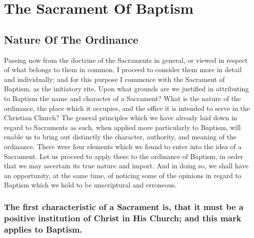 \documentclass[english,]{book}
\begin{document}
\hypertarget{the-sacrament-of-baptism}{%
\chapter{The Sacrament Of Baptism}\label{the-sacrament-of-baptism}}

\hypertarget{nature-of-baptism}{%
\section{Nature Of The Ordinance}\label{nature-of-baptism}}

Passing now from the doctrine of the Sacraments in general, or viewed in respect of what belongs to them in common, I proceed to consider them more in detail and individually; and for this purpose I commence with the Sacrament of Baptism, as the initiatory rite. Upon what grounds are we justified in attributing to Baptism the name and character of a Sacrament? What is the nature of the ordinance, the place which it occupies, and the office it is intended to serve in the Christian Church? The general principles which we have already laid down in regard to Sacraments as such, when applied more particularly to Baptism, will enable us to bring out distinctly the character, authority, and meaning of the ordinance. There were four elements which we found to enter into the idea of a Sacrament. Let us proceed to apply these to the ordinance of Baptism, in order that we may ascertain its true nature and import. And in doing so, we shall have an opportunity, at the same time, of noticing some of the opinions in regard to Baptism which we hold to be unscriptural and erroneous.

\hypertarget{the-first-characteristic-of-a-sacrament-is-that-it-must-be-a-positive-institution-of-christ-in-his-church-and-this-mark-applies-to-baptism.}{%
\subsection{The first characteristic of a Sacrament is, that it must be a positive institution of Christ in His Church; and this mark applies to Baptism.}\label{the-first-characteristic-of-a-sacrament-is-that-it-must-be-a-positive-institution-of-christ-in-his-church-and-this-mark-applies-to-baptism.}}
\end{document}
